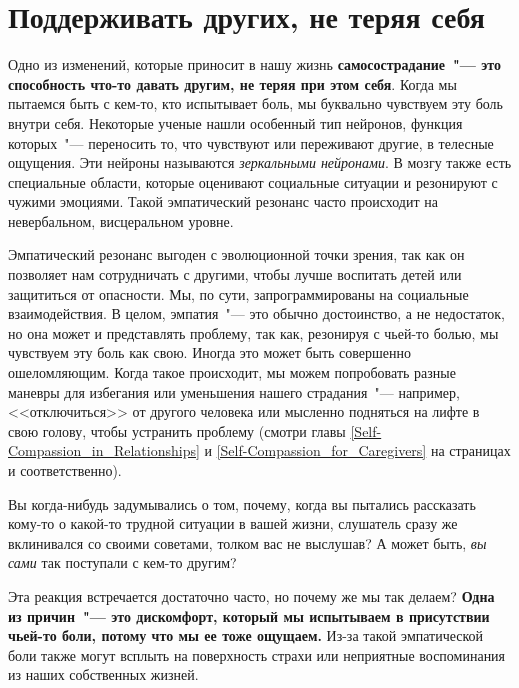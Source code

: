 
\chapter{Поддерживать других, не теряя себя} \label{Being_There_for_Others_without_Losing_Ourselves}

Одно из изменений, которые приносит в нашу жизнь \textbf{самосострадание~"--- это способность что-то давать другим, не теряя при этом себя}. Когда мы пытаемся быть с кем-то, кто испытывает боль, мы буквально чувствуем эту боль внутри себя.  Некоторые ученые нашли особенный тип нейронов, функция которых~"--- переносить то, что чувствуют или переживают другие, в телесные ощущения. Эти нейроны называются \emph{зеркальными нейронами}\cite{85}.  В мозгу также есть специальные области, которые оценивают социальные ситуации и резонируют с чужими эмоциями\cite{86}. Такой эмпатический резонанс часто происходит на невербальном, висцеральном уровне. 

Эмпатический резонанс выгоден с эволюционной точки зрения, так как он позволяет нам сотрудничать с другими, чтобы лучше воспитать детей или защититься от опасности. Мы, по сути, запрограммированы на социальные взаимодействия. В целом, эмпатия~"--- это обычно достоинство, а не недостаток, но она может и представлять проблему, так как, резонируя с чьей-то болью, мы чувствуем эту боль как свою. Иногда это может быть совершенно ошеломляющим. Когда такое происходит, мы можем попробовать разные маневры для избегания или уменьшения нашего страдания~"--- например, <<отключиться>> от другого человека или мысленно подняться на лифте в свою голову, чтобы устранить проблему (смотри главы \ref{Self-Compassion_in_Relationships} и \ref{Self-Compassion_for_Caregivers} на страницах \pageref{Self-Compassion_in_Relationships} и \pageref{Self-Compassion_for_Caregivers} соответственно). 

Вы когда-нибудь задумывались о том, почему, когда вы пытались рассказать кому-то о какой-то трудной ситуации в вашей жизни, слушатель сразу же вклинивался со своими советами, толком вас не выслушав? А может быть, \emph{вы сами} так поступали с кем-то другим? 

Эта реакция встречается достаточно часто, но почему же мы так делаем? \textbf{Одна из причин~"--- это дискомфорт, который мы испытываем в присутствии чьей-то боли, потому что мы ее тоже ощущаем.} Из-за такой эмпатической боли также могут всплыть на поверхность страхи или неприятные воспоминания из наших собственных жизней. 

